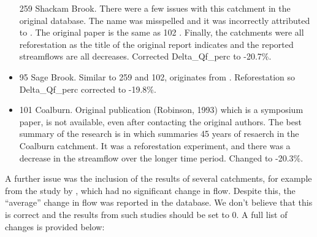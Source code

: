 \documentclass[]{elsarticle} %
\begin{document}
\begin{itemize}
  259 Shackam Brook. There were a few issues with this catchment in the original database. The name was misspelled and it was incorrectly attributed to \citet{brown2005}. The original paper is the same as 102 \citep{schneider1961}. Finally, the catchments were all reforestation as the title of the original report indicates and the reported streamflows are all decreases. Corrected Delta\_Qf\_perc to -20.7\%.\\
\item
  95 Sage Brook. Similar to 259 and 102, originates from \citet{schneider1961}. Reforestation so Delta\_Qf\_perc corrected to -19.8\%.\\
\item
  101 Coalburn. Original publication (Robinson, 1993) which is a symposium paper, is not available, even after contacting the original authors. The best summary of the research is in \citet{birkinshaw2014} which summaries 45 years of resaerch in the Coalburn catchment. It was a reforestation experiment, and there was a decrease in the streamflow over the longer time period. Changed to -20.3\%.
\end{itemize}

A further issue was the inclusion of the results of several catchments, for example from the study by \citet{beck2013}, which had no significant change in flow. Despite this, the ``average'' change in flow was reported in the database. We don't believe that this is correct and the results from such studies should be set to 0. A full list of changes is provided below:
\end{document}
